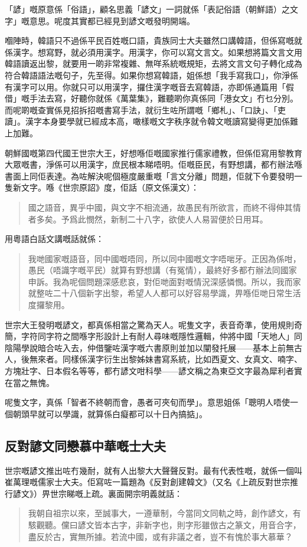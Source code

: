 \documentclass[a5paper, 12pt, openany]{book} %
\begin{document}
「諺」嘅原意係「俗語」，顧名思義「諺文」一詞就係「表記俗語（朝鮮語）之文字」嘅意思。呢度其實都已經見到諺文嘅發明開端。

嗰陣時，韓語只不過係平民百姓嘅口語，貴族同士大夫雖然口講韓語，但係寫嘅就係漢字。想寫野，就必須用漢字。用漢字，你可以寫文言文。如果想將篇文言文用韓語讀返出黎，就要用一啲非常複雜、無咩系統嘅規矩，去將文言文句子轉化成為符合韓語語法嘅句子，先至得。如果你想寫韓語，姐係想「我手寫我口」，你淨係有漢字可以用。你就只可以用漢字，攞住漢字嘅音去寫韓語，亦即係通篇用「假借」嘅手法去寫，好聽你就係《萬葉集》，難聽啲你真係同「港女文」冇乜分別。而呢啲嘅查實係見招拆招嘅書寫手法，就衍生咗所謂嘅「鄉札」、「口訣」、「吏讀」。漢字本身要學就已經成本高，噉樣嘅文字秩序就令韓文嘅讀寫變得更加係難上加難。

朝鮮國嘅第四代國王世宗大王，好想喺佢嘅國家推行儒家禮教，但係佢寫用黎教育大眾嘅書，淨係可以用漢字，庶民根本睇唔明。佢嘅臣民，有野想講，都冇辦法喺書面上同佢表達。為咗解決呢個極度嚴重嘅「言文分離」問題，佢就下令要發明一隻新文字。喺《世宗原詔》度，佢話（原文係漢文）：
\begin{quotation}
	國之語音，異乎中國，與文字不相流通，故愚民有所欲言，而終不得伸其情者多矣。予爲此憫然，新制二十八字，欲使人人易習便於日用耳。
	
\end{quotation}
用粵語白話文講嘅話就係：

\begin{quotation}
	我哋國家嘅語音，同中國嘅唔同，所以同中國嘅文字唔啱牙。正因為係咁，愚民（唔識字嘅平民）就算有野想講（有冤情），最終好多都冇辦法同國家申訴。我為呢個問題深感悲哀，對佢哋面對嘅情況深感憐憫。所以，我而家就整咗二十八個新字出黎，希望人人都可以好容易學識，畀喺佢哋日常生活度攞黎用。
\end{quotation}

世宗大王發明嘅諺文，都真係相當之驚為天人。呢隻文字，表音奇準，使用規則奇簡，字符同字符之間喺字形設計上有耐人尋味嘅隱性邏輯，仲將中國「天地人」同陰陽學說暗合咗入去，仲借鑒咗漢字嘅六書原則並加以闡發托展——基本上前無古人，後無來者。同樣係漢字衍生出黎姊妹書寫系統，比如西夏文、女真文、喃字、方塊壯字、日本假名等等，都冇諺文咁科學——諺文稱之為東亞文字最為犀利者實在當之無愧。

呢隻文字，真係「智者不終朝而會，愚者可夾旬而學」。意思姐係「聰明人唔使一個朝頭早就可以學識，就算係白癡都可以十日內搞掂」。

\subsection*{反對諺文同戀慕中華嘅士大夫}
世宗嘅諺文推出咗冇幾耐，就有人出黎大大聲聲反對。最有代表性嘅，就係一個叫崔萬理嘅儒家士大夫。佢寫咗一篇題為《反對創建韓文》（又名《上疏反對世宗推行諺文》）畀世宗睇嘅上疏。裏面開宗明義就話：
\begin{quotation}
	我朝自祖宗以來，至誠事大，一遵華制，今當同文同軌之時，創作諺文，有駭觀聽。儻曰諺文皆本古字，非新字也，則字形雖倣古之篆文，用音合字，盡反於古，實無所據。若流中國，或有非議之者，豈不有愧於事大慕華？	
\end{quotation}
\end{document}

